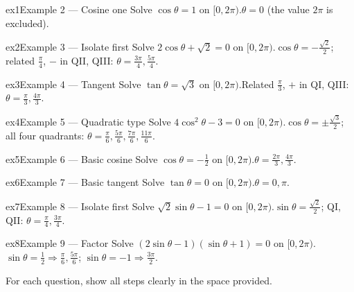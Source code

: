 \documentclass[11pt]{article}
\begin{document}
\begin{example}{ex1}{Example 2 --- Cosine one}
Solve $\cos\theta=1$ on $[0,2\pi)$.\soln $\theta=0$ (the value $2\pi$ is excluded).
\end{example}

\begin{example}{ex2}{Example 3 --- Isolate first}
Solve $2\cos\theta+\sqrt2=0$ on $[0,2\pi)$.\soln $\cos\theta=-\tfrac{\sqrt2}{2}$; related $\tfrac{\pi}{4}$, $-$ in QII, QIII: $\theta=\tfrac{3\pi}{4},\tfrac{5\pi}{4}$.
\end{example}

\begin{example}{ex3}{Example 4 --- Tangent}
Solve $\tan\theta=\sqrt3$ on $[0,2\pi)$.\soln Related $\tfrac{\pi}{3}$, $+$ in QI, QIII: $\theta=\tfrac{\pi}{3},\tfrac{4\pi}{3}$.
\end{example}

\begin{example}{ex4}{Example 5 --- Quadratic type}
Solve $4\cos^2\theta-3=0$ on $[0,2\pi)$.\soln $\cos\theta=\pm\tfrac{\sqrt3}{2}$; all four quadrants: $\theta=\tfrac{\pi}{6},\tfrac{5\pi}{6},\tfrac{7\pi}{6},\tfrac{11\pi}{6}$.
\end{example}

\begin{example}{ex5}{Example 6 --- Basic cosine}
Solve $\cos\theta=-\tfrac12$ on $[0,2\pi)$.\soln $\theta=\tfrac{2\pi}{3},\tfrac{4\pi}{3}$.
\end{example}

\begin{example}{ex6}{Example 7 --- Basic tangent}
Solve $\tan\theta=0$ on $[0,2\pi)$.\soln $\theta=0,\pi$.
\end{example}

\begin{example}{ex7}{Example 8 --- Isolate first}
Solve $\sqrt2\sin\theta-1=0$ on $[0,2\pi)$.\soln $\sin\theta=\tfrac{\sqrt2}{2}$; QI, QII: $\theta=\tfrac{\pi}{4},\tfrac{3\pi}{4}$.
\end{example}

\begin{example}{ex8}{Example 9 --- Factor}
Solve $(2\sin\theta-1)(\sin\theta+1)=0$ on $[0,2\pi)$.\soln $\sin\theta=\tfrac12\Rightarrow\tfrac{\pi}{6},\tfrac{5\pi}{6}$; $\sin\theta=-1\Rightarrow\tfrac{3\pi}{2}$.
\end{example}

\clearpage
{}
For each question, show all steps clearly in the space provided.
\end{document}
